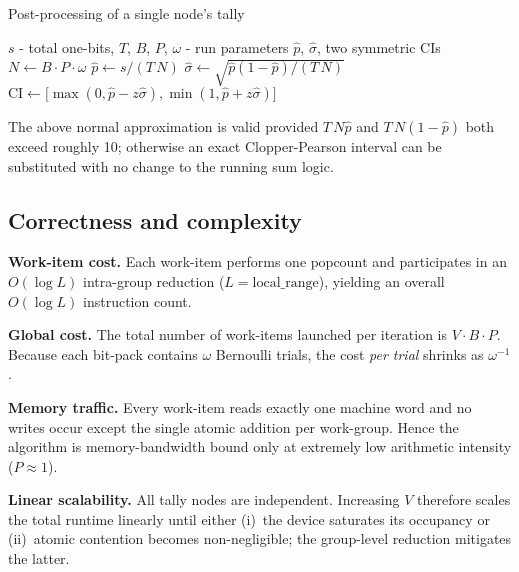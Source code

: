 \begin{algorithm}[H]
\caption{Post-processing of a single node's tally}
\label{alg:update_stats}
\begin{algorithmic}[1]
  \Require
    \(s\) - total one-bits,
    \(T\), \(B\), \(P\), \(\omega\) - run parameters
  \Ensure
    \(\widehat{p}\), \(\widehat{\sigma}\), two symmetric CIs
  \State $N\gets B\cdot P\cdot\omega$
  \State $\widehat{p}\gets s / (T\,N)$
  \State $\widehat{\sigma}\gets
          \sqrt{\widehat{p}(1-\widehat{p})/(T\,N)}$
      \State $\text{CI}\gets
        \bigl[\max(0,\widehat{p}-z\widehat{\sigma}),
              \min(1,\widehat{p}+z\widehat{\sigma})\bigr]$
  \EndFor
\end{algorithmic}
\end{algorithm}

The above normal approximation is valid provided \(T\,N\widehat{p}\)
and \(T\,N(1-\widehat{p})\) both exceed roughly 10; otherwise an exact
Clopper-Pearson interval can be substituted with no change to the running
sum logic.

\subsection{Correctness and complexity}

\textbf{Work-item cost.}
Each work-item performs one \(\mathrm{popcount}\) and
participates in an \(O(\log L)\) intra-group reduction
(\(L\!=\!\text{local\_range}\)), yielding an overall
\(O(\log L)\) instruction count.

\textbf{Global cost.}
The total number of work-items launched per iteration is
\(V\cdot B\cdot P\).  Because each bit-pack contains \(\omega\) Bernoulli
trials, the cost \emph{per trial} shrinks as \(\omega^{-1}\).

\textbf{Memory traffic.}
Every work-item reads exactly one machine word and no writes occur except
the single atomic addition per work-group.  Hence the algorithm is
memory-bandwidth bound only at extremely low arithmetic intensity
(\(P\approx 1\)).

\textbf{Linear scalability.}
All tally nodes are independent.  Increasing \(V\) therefore scales the total
runtime linearly until either (i)~the device saturates its occupancy or
(ii)~atomic contention becomes non-negligible; the group-level reduction
mitigates the latter.
